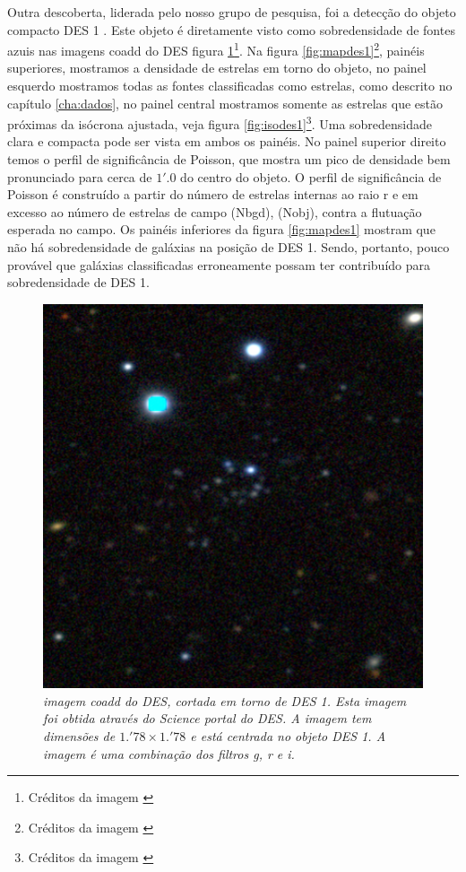 \documentclass[
	12pt,				%
	openany,			%
	oneside,			%
	a4paper,			%
	english,			%
	brazil				%
	]{abntex2}
\begin{document}
Outra descoberta, liderada pelo nosso grupo de pesquisa, foi a detecção do objeto compacto DES 1 \cite{2015arXiv150802381L}. Este objeto é diretamente visto como sobredensidade de fontes azuis nas imagens coadd do DES figura \ref{fig:des1}\footnote{Créditos da imagem \cite{2015arXiv150802381L}}. Na figura \ref{fig:mapdes1}\footnote{Créditos da imagem \cite{2015arXiv150802381L}}, painéis superiores, mostramos a densidade de estrelas em torno do objeto, no painel esquerdo mostramos todas as fontes classificadas como estrelas, como descrito no capítulo \ref{cha:dados},  no painel central mostramos somente as estrelas que estão próximas da isócrona ajustada, veja figura \ref{fig:isodes1}\footnote{Créditos da imagem \cite{2015arXiv150802381L}}. Uma sobredensidade clara e compacta pode ser vista em ambos os painéis. No painel superior direito temos o perfil de significância de Poisson, que mostra um pico de densidade bem pronunciado para cerca de $1'.0$ do centro do objeto. O perfil de significância de Poisson é construído a partir do número de estrelas internas ao raio r e em excesso ao número de estrelas de campo (Nbgd), (Nobj), contra a flutuação esperada no campo. Os painéis inferiores da figura \ref{fig:mapdes1} mostram que não há sobredensidade de galáxias na posição de DES 1. Sendo, portanto, pouco provável que galáxias classificadas erroneamente possam ter contribuído para sobredensidade de DES 1.    

\begin{figure}[h]
\begin{center}
\includegraphics[width=12cm]{figuras/des1.pdf}
\caption{\textit{imagem coadd do DES, cortada em torno de DES 1. Esta imagem foi obtida através do Science portal do DES. A imagem tem  dimensões de $1.'78 × 1.'78  $ e está centrada no objeto  DES 1. A imagem é uma combinação dos filtros g, r e i. }}
\label{fig:des1}
\end{center}
\end{figure}
\vspace{0.5cm}
\end{document}

